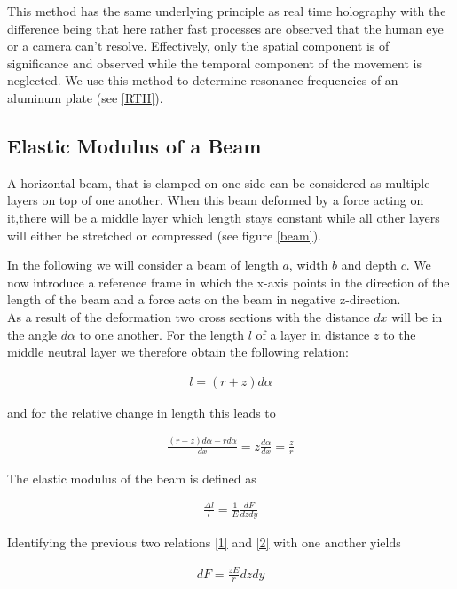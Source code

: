 This method has the same underlying principle as real time holography with the difference being that here rather fast processes are observed that the human eye or a camera can't resolve. Effectively, only the spatial component is of significance and observed while the temporal component of the movement is neglected. We use this method to determine resonance frequencies of an aluminum plate (see \ref{RTH}).



\subsection{Elastic Modulus of a Beam \label{EMB}}

A horizontal beam, that is clamped on one side can be considered as multiple layers on top of one another. When this beam deformed by a force acting on it,there will be a middle layer which length stays constant while all other layers will either be stretched or compressed (see figure \ref{beam}).

In the following we will consider a beam of length $a$, width $b$ and depth $c$. We now introduce a reference frame in which the x-axis points in the direction of the length of the beam and a force acts on the beam in negative z-direction.\\

As a result of the deformation two cross sections with the distance $dx$ will be in the angle $d\alpha$ to one another. For the length $l$ of a layer in distance $z$ to the middle neutral layer we therefore obtain the following relation:

\begin{align}
l=(r+z)d\alpha
\end{align}


and for the relative change in length this leads to

\begin{align}
\frac{(r+z)d\alpha-r d\alpha}{dx}=z\frac{d\alpha}{dx}=\frac{z}{r} \label{1}
\end{align}


The elastic modulus of the beam is defined as

\begin{align}
\frac{\Delta l}{l}=\frac{1}{E}\frac{dF}{dzdy} \label{2}
\end{align}


Identifying the previous two relations \ref{1} and \ref{2} with one another yields

\begin{align}
dF=\frac{zE}{r}dzdy
\end{align}

